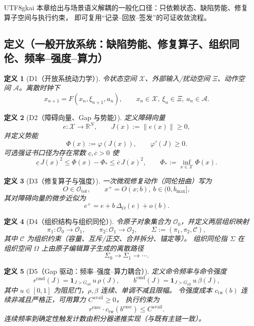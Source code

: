 \documentclass[12pt]{article}
\newtheorem{definition}{定义}[section]
\newcommand{\RR}{\mathbb{R}}
\newcommand{\indicator}[1]{\mathbf{1}_{#1}}
\begin{document}
\begin{CJK*}{UTF8}{gkai}
本章给出与场景语义解耦的一般化口径：只依赖状态、缺陷势能、修复算子空间与执行约束，
即可复用“记录--回放--签发”的可证收敛流程。

\subsection{定义（一般开放系统：缺陷势能、修复算子、组织同伦、频率--强度--算力）}
\label{subsec:tex28-ch14-defs}

\begin{definition}[D1（开放系统动力学）]
\label{def:tex28-ch14-d1}
令状态空间 $\mathcal X$、外部输入/扰动空间 $\Xi$、动作空间 $\mathcal A$。离散时钟下
\[
  x_{n+1}=F(x_n,\xi_{n+1},a_n),
  \qquad
  x_n\in\mathcal X,\ \xi_n\in\Xi,\ a_n\in\mathcal A.
\]
\end{definition}

\begin{definition}[D2（障碍向量、Gap 与势能）]
\label{def:tex28-ch14-d2}
定义障碍向量
\[
  e:\mathcal X\to\RR^N,
  \qquad
  J(x):=\|e(x)\|\ge 0,
\]
并定义势能
\[
  \Phi(x):=\varphi(J(x)),
  \qquad
  \varphi'(J)\ge 0.
\]
可选强证书口径为存在常数 $\underline c,\overline c>0$ 使
\[
  \underline c\,J(x)^2
  \le
  \Phi(x)-\Phi_*
  \le
  \overline c\,J(x)^2,
  \qquad
  \Phi_*:=\inf_{x\in\mathcal X}\Phi(x).
\]
\end{definition}

\begin{definition}[D3（修复算子与强度）]
\label{def:tex28-ch14-d3}
一次微观修复动作（同伦扭曲）写为
\[
  O\in\mathcal O_{\mathrm{tot}},
  \qquad
  x^+=O(x;b),\ b\in(0,b_{\max}],
\]
其对障碍向量的微步近似为
\[
  e^+=e+b\,\Delta_O(e)+o(b).
\]
\end{definition}

\begin{definition}[D4（组织结构与组织同伦）]
\label{def:tex28-ch14-d4}
令原子对象集合为 $\mathcal O_0$，并定义两层组织映射
\[
  \pi_1:\mathcal O_0\to\mathcal O_1,
  \qquad
  \pi_2:\mathcal O_1\to\mathcal O_2,
  \qquad
  \Sigma:=(\pi_1,\pi_2,\mathcal C),
\]
其中 $\mathcal C$ 为组织约束（容量、互斥/正交、合并拆分、锚定等）。
组织同伦指 $\Sigma$ 在组织空间 $\Omega$ 上由原子编辑算子生成的离散路径
\[
  \Sigma_0\to\Sigma_1\to\cdots.
\]
\end{definition}

\begin{definition}[D5（Gap 驱动：频率--强度--算力耦合）]
\label{def:tex28-ch14-d5}
定义命令频率与命令强度
\[
  r^{\mathrm{cmd}}(J)=\indicator{J>G_{\mathrm{off}}}\,u\,\rho(J),
  \qquad
  b^{\mathrm{cmd}}(J)=\indicator{J>G_{\mathrm{off}}}\,u\,\beta(J),
\]
其中 $u\in[0,1]$ 为阻尼门，$\rho,\beta$ 连续、单调不减且限幅。
令强度成本 $c_{\mathrm{tw}}(b)$ 连续非减且严格正，可用算力 $C^{\mathrm{avail}}\ge 0$，
执行约束为
\[
  r^{\mathrm{exec}}\cdot c_{\mathrm{tw}}(b^{\mathrm{exec}})
  \le
  C^{\mathrm{avail}}.
\]
连续频率到确定性触发计数由积分器递推实现（与既有主链一致）。
\end{definition}


\end{CJK*}
\end{document}
